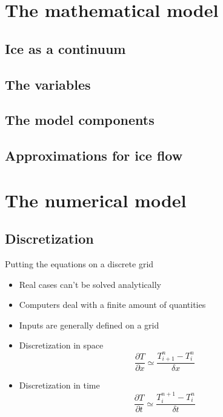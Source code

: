 \documentclass{beamer}
\begin{document}

\section{The mathematical model}

\subsection{Ice as a continuum}


\subsection{The variables}


\subsection{The model components}


\subsection{Approximations for ice flow}




\section{The numerical model}

\subsection{Discretization}

\begin{frame}{Putting the equations on a discrete grid}
	\begin{itemize}
		\item Real cases can't be solved analytically
		\item Computers deal with a finite amount of quantities
		\item Inputs are generally defined on a grid
		\item Discretization in space
$$\frac{\partial T}{\partial x}\simeq\frac{T_{i+1}^n-T_{i}^n}{\delta x}$$
		\item Discretization in time
$$\frac{\partial T}{\partial t}\simeq\frac{T_i^{n+1}-T_i^n}{\delta t}$$
	\end{itemize}
\end{frame}
\end{document}
